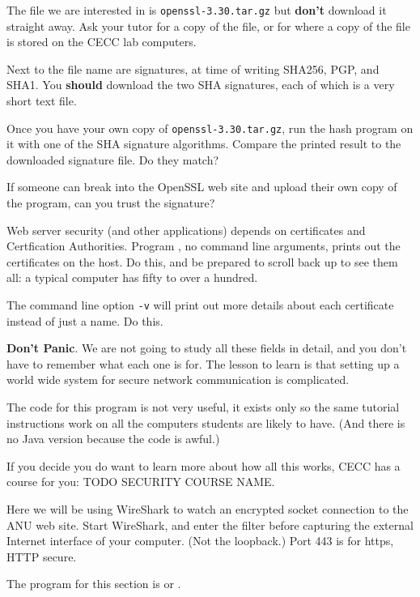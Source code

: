 The file we are interested in is \texttt{openssl-3.30.tar.gz} but \textbf{don't}
download it straight away. Ask your tutor for a copy of the file, or for where
a copy of the file is stored on the CECC lab computers.

Next to the file name are signatures, at time of writing SHA256, PGP, and SHA1.
You \textbf{should} download the two SHA signatures, each of which is a very
short text file.

Once you have your own copy of \texttt{openssl-3.30.tar.gz}, run the hash
program on it with one of the SHA signature algorithms. Compare the printed
result to the downloaded signature file. Do they match?

If someone can break into the OpenSSL web site and upload their own copy of
the program, can you trust the signature?



\STEP Web server security (and other applications) depends on certificates
and Certfication Authorities. Program ,
no command line arguments, prints out the certificates on the host.
Do this, and be prepared to scroll back up to see them all: a typical computer
has fifty to over a hundred.

\STEP The command line option \texttt{-v} will print out more details about
each certificate instead of just a name. Do this.

\textbf{Don't Panic}. We are not going to study all these fields in detail,
and you don't have to remember what each one is for. The lesson to learn
is that setting up a world wide system for secure network communication is
complicated.

The code for this program is not very useful, it exists only so the same
tutorial instructions work on all the computers students are likely to have.
(And there is no Java version because the code is awful.)

If you decide you do want to learn more about how all this works, CECC
has a course for you: TODO SECURITY COURSE NAME.



Here we will be using WireShark to watch an encrypted socket connection
to the ANU web site. Start WireShark, and enter the filter
before capturing the external Internet interface of your computer. (Not the
loopback.) Port 443 is for https, HTTP secure.

\STEP The program for this section is  or .

